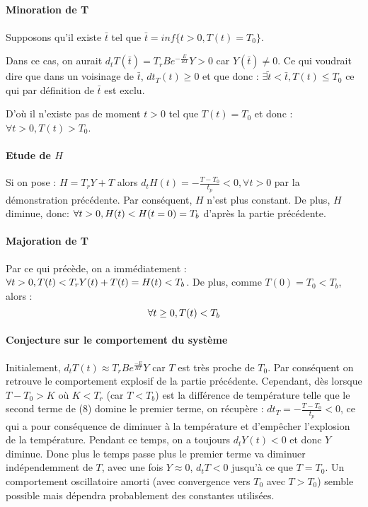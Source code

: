 \documentclass[10pt,a4paper]{report}
\begin{document}
\subsection{}%

\subsubsection{} %

\paragraph{Minoration de T}
Supposons qu'il existe $\bar{t}$ tel que $\bar{t} = inf\{t>0, T(t) = T_0\}$.

Dans ce cas, on aurait $d_tT(\bar{t}) = T_rB e^{-\frac{E}{RT}}Y > 0$ car $Y(\bar{t}) \neq 0$. Ce qui voudrait dire que dans un voisinage de $\bar{t}$, $dt_T(t) \geq 0$ et que donc :
$\exists \tilde{t} < \bar{t}, T(t) \leq T_0$ ce qui par définition de $\bar{t}$ est exclu. 

D'où il n'existe pas de moment $t>0$ tel que $T(t) = T_0$ et donc : $\forall t >0, T(t)>T_0$.

\paragraph{Etude de $H$}

Si on pose : $H = T_r Y + T$ alors $d_tH(t) = -\frac{T-T_0}{t_p} < 0, \forall t>0$ par la démonstration précédente. Par conséquent, $H$ n'est plus constant. De plus, $H$ diminue, donc: $\forall t > 0, \space H(t)< H(t=0) = T_b$ d'après la partie précédente.

\paragraph{Majoration de T}

Par ce qui précède, on a immédiatement : $\forall t > 0, \space T(t) < T_r Y(t)+T(t) = H(t) < T_b$.
De plus, comme $T(0) = T_0 < T_b$, alors : 
$$ \forall t \geq 0, \space T(t) < T_b $$

\paragraph{Conjecture sur le comportement du système}

Initialement, $d_tT(t) \approx T_rBe^{\frac{-E}{RT}}Y$ car $T$ est très proche de $T_0$.
Par conséquent on retrouve le comportement explosif de la partie précédente. Cependant, dès lorsque $T-T_0>K$ où $K < T_r$ (car $T<T_b$) est la différence de température telle que le second terme de (8) domine le premier terme, on récupère : $dt_T = -\frac{T-T_0}{t_p} < 0$, ce qui a pour conséquence de diminuer à la température et d'empêcher l'explosion de la température. Pendant ce temps, on a toujours $d_tY(t) < 0$ et donc $Y$ diminue. Donc plus le temps passe plus le premier terme va diminuer indépendemment de $T$, avec une fois $Y\approx0$, $d_tT < 0$ jusqu'à ce que $T=T_0$. Un comportement oscillatoire amorti (avec convergence vers $T_0$ avec $T>T_0$) semble possible mais dépendra probablement des constantes utilisées.
\end{document}
